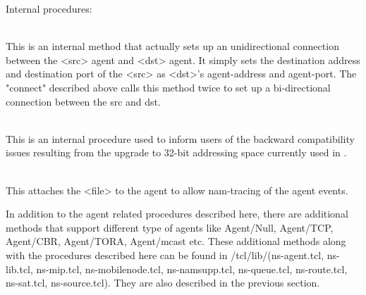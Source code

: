 \begin{flushleft}
Internal procedures:

\\
This is an internal method that actually sets up an unidirectional connection
between the <src> agent and <dst> agent. It simply sets the destination address
and destination port of the <src> as <dst>'s agent-address and agent-port.
The "connect" described above calls this method twice to set up a bi-directional
connection between the src and dst.


\\
This is an internal procedure used to inform users of the backward compatibility
issues resulting from the upgrade to 32-bit addressing space currently used
in \ns.

\\
This attaches the <file> to the agent to allow nam-tracing of the agent
events.


In addition to the agent related procedures described here, there are additional
methods that support different type of agents like Agent/Null, Agent/TCP,
Agent/CBR, Agent/TORA, Agent/mcast etc. These additional methods along
with the procedures described here can be found in \ns/tcl/lib/(ns-agent.tcl,
ns-lib.tcl, ns-mip.tcl, ns-mobilenode.tcl, ns-namsupp.tcl, ns-queue.tcl,
ns-route.tcl, ns-sat.tcl, ns-source.tcl). They are also described in the
previous section.

\end{flushleft} 

\endinput
